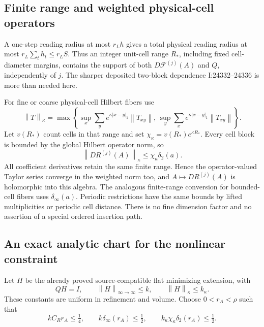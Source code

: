 \documentclass[11pt]{article}
\theoremstyle{remark}
\newcommand{\norm}[1]{\left\|#1\right\|}
\begin{document}
\subsection{Finite range and weighted physical-cell operators}
\label{na-weighted}

A one-step reading radius at most $r_Lh$ gives a total physical
reading radius at most $r_L\sum_t h_t\le r_LS$. Thus an integer
unit-cell range $R_*$, including fixed cell-diameter margins,
contains the support of both $D\mathcal F^{(j)}(A)$ and $Q$,
independently of $j$. The sharper deposited two-block dependence
I:24332--24336 is more than needed here.

For fine or coarse physical-cell Hilbert fibers use
\begin{equation}
 \norm{T}_\kappa=\max\left\{
  \sup_x\sum_y e^{\kappa|x-y|_1}\norm{T_{xy}},\,
  \sup_y\sum_x e^{\kappa|x-y|_1}\norm{T_{xy}}\right\}.
 \label{na-schur-norm}
\end{equation}
Let $v(R_*)$ count cells in that range and set
$\chi_\kappa=v(R_*)e^{\kappa R_*}$. Every cell block is bounded
by the global Hilbert operator norm, so
\begin{equation}
 \norm{DR^{(j)}(A)}_\kappa\le\chi_\kappa\delta_2(a).
 \label{na-weighted-deviation}
\end{equation}
All coefficient derivatives retain the same finite range. Hence the
operator-valued Taylor series converge in the weighted norm too,
and $A\mapsto DR^{(j)}(A)$ is holomorphic into this algebra.
The analogous finite-range conversion for bounded-cell fibers uses
$\delta_\infty(a)$. Periodic restrictions have the same bounds by
lifted multiplicities or periodic cell distance. There is no fine
dimension factor and no assertion of a special ordered insertion
path.

\subsection{An exact analytic chart for the nonlinear constraint}
\label{na-chart}

Let $H$ be the already proved source-compatible flat minimizing
extension, with
\begin{equation}
 QH=I,\qquad \norm{H}_{\infty\to\infty}\le k,
 \qquad \norm{H}_\kappa\le k_\kappa.
 \label{na-H-input}
\end{equation}
These constants are uniform in refinement and volume. Choose
$0<r_A<\rho$ such that
\begin{equation}
 kC_Rr_A\le\tfrac14,\qquad
 k\delta_\infty(r_A)\le\tfrac12,\qquad
 k_\kappa\chi_\kappa\delta_2(r_A)\le\tfrac12.
 \label{na-chart-radius}
\end{equation}
\end{document}
